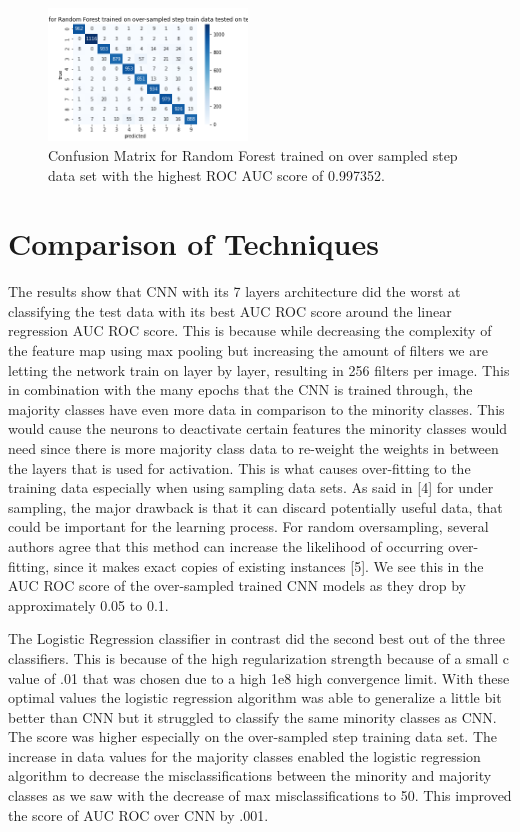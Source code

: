 \documentclass[Dealing with Imbalance in Computer Vision]{IEEEtran}
\begin{document}
\begin{figure}[]
\centerline{\includegraphics[width=200px]{Confusion_Matrix_Random Forest_trained_over-sampled_step_train.png}}
\caption{Confusion Matrix for Random Forest trained on over sampled step data set with the highest ROC AUC score of 0.997352.}
\label{fig7}
\end{figure}

\section{Comparison of Techniques}
The results show that CNN with its 7 layers architecture did the worst at classifying the test data with its best AUC ROC score around the linear regression AUC ROC score. This is because while decreasing the complexity of the feature map using max pooling but increasing the amount of filters we are letting the network train on layer by layer, resulting in 256 filters per image. This in combination with the many epochs that the CNN is trained through, the majority classes have even more data in comparison to the minority classes. This would cause the neurons to deactivate certain features the minority classes would need since there is more majority class data to re-weight the weights in between the layers that is used for activation. This is what causes over-fitting to the training data especially when using sampling data sets. As said in [4] for under sampling, the major drawback is that it can discard potentially useful data, that could be important for the learning process. For random oversampling, several authors agree that this method can increase the likelihood of occurring over-fitting, since it makes exact copies of existing instances [5]. We see this in the AUC ROC score of the over-sampled trained CNN models as they drop by approximately 0.05 to 0.1. 

The Logistic Regression classifier in contrast did the second best out of the three classifiers. This is because of the high regularization strength because of a small c value of .01 that was chosen due to a high 1e8 high convergence limit. With these optimal values the logistic regression algorithm was able to generalize a little bit better than CNN but it struggled to classify the same minority classes as CNN. The score was higher especially on the over-sampled step training data set. The increase in data values for the majority classes enabled the logistic regression algorithm to decrease the misclassifications between the minority and majority classes as we saw with the decrease of max misclassifications to 50. This improved the score of AUC ROC over CNN by .001.
\end{document}

